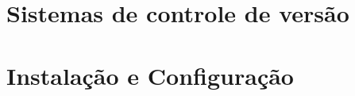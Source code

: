 \documentclass[
  a5paper,
  pagesize,
  9pt,
  pointlessnumbers,
  normalheadings,
  twoside=false
]{book}
\begin{document}
\newpage



\hypersetup{linkcolor=black}
\setcounter{tocdepth}{2}
\tableofcontents


\chapter{Sistemas de controle de versão}


\chapter{Instalação e Configuração}


% 
% 
% 
% 
% 
% 
% 
\end{document}
